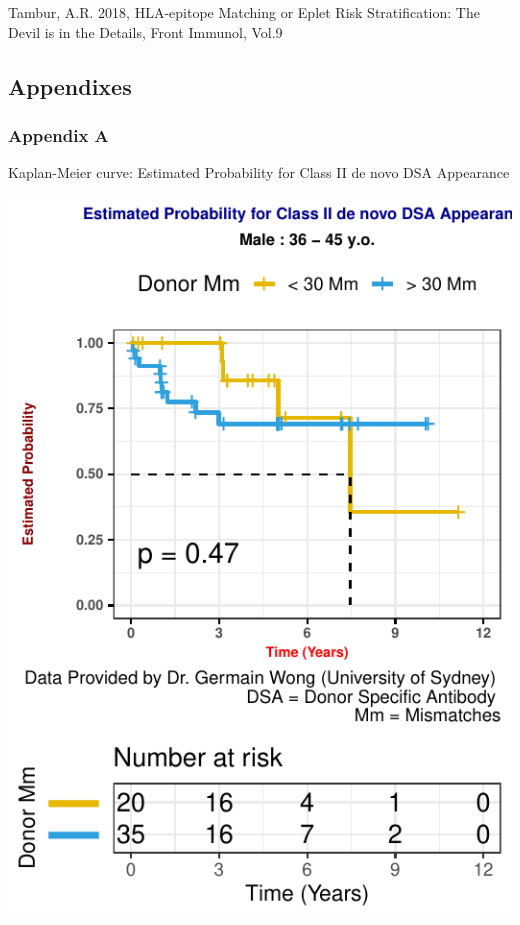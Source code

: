 \documentclass[a4paper,9pt,twocolumn,twoside,]{pinp}
\begin{document}
Tambur, A.R. 2018, HLA-epitope Matching or Eplet Risk Stratification:
The Devil is in the Details, Front Immunol, Vol.9

\hypertarget{appendixes}{%
\subsection{Appendixes}\label{appendixes}}

\hypertarget{appendix-a}{%
\subsubsection{Appendix A}\label{appendix-a}}

Kaplan-Meier curve: Estimated Probability for Class II de novo DSA
Appearance

\begin{center}\includegraphics{Executive_Report_files/figure-latex/eplet-1} \end{center}
\end{document}
